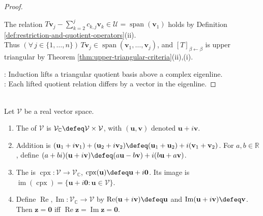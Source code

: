 \begin{theorem}
\begin{proof}
\begin{enumerate}[label=(\roman*)]
The relation $T\mathbf{v}_j-\sum\limits_{k=2}^{j}c_{k,j}\mathbf{v}_k\in\mathcal{U}=\operatorname{span}(\mathbf{v}_1)$ holds by Definition \ref{def:restriction-and-quotient-operators}(ii).\\
Thus $(\forall\,j\in\{1,\ldots,n\})\,T\mathbf{v}_j\in\operatorname{span}(\mathbf{v}_1,\ldots,\mathbf{v}_j)$, and $[T]_{\beta\leftarrow\beta}$ is upper triangular by Theorem \ref{thm:upper-triangular-criteria}(ii),(i).
\end{enumerate}
: Induction lifts a triangular quotient basis above a complex eigenline.\\
: Each lifted quotient relation differs by a vector in the eigenline.
\end{proof}
\end{theorem}

\begin{definition} \label{def:complexification-real-vector-space} \\
Let $\mathcal{V}$ be a real vector space.
\begin{enumerate}[label=(\roman*)]
\setlength{\itemsep}{0pt}
\item The  of $\mathcal{V}$ is $\mathcal{V}_{\mathbb{C}}\defeq\mathcal{V}\times\mathcal{V}$, with $(\mathbf{u},\mathbf{v})$ denoted $\mathbf{u}+i\mathbf{v}$.
\item Addition is $(\mathbf{u}_1+i\mathbf{v}_1)+(\mathbf{u}_2+i\mathbf{v}_2)\defeq(\mathbf{u}_1+\mathbf{u}_2)+i(\mathbf{v}_1+\mathbf{v}_2)$. For $a,b\in\mathbb{R}$, define $(a+bi)(\mathbf{u}+i\mathbf{v})\defeq(a\mathbf{u}-b\mathbf{v})+i(b\mathbf{u}+a\mathbf{v})$.
\item The  is $\operatorname{cpx}:\mathcal{V}\to\mathcal{V}_{\mathbb{C}}$, $\operatorname{cpx}(\mathbf{u})\defeq\mathbf{u}+i\mathbf{0}$. Its image is $\operatorname{im}(\operatorname{cpx})=\{\mathbf{u}+i\mathbf{0}:\mathbf{u}\in\mathcal{V}\}$.
\item Define $\operatorname{Re},\operatorname{Im}:\mathcal{V}_{\mathbb{C}}\to\mathcal{V}$ by $\operatorname{Re}(\mathbf{u}+i\mathbf{v})\defeq\mathbf{u}$ and $\operatorname{Im}(\mathbf{u}+i\mathbf{v})\defeq\mathbf{v}$. Then $\mathbf{z}=\mathbf{0}$ iff $\operatorname{Re}\mathbf{z}=\operatorname{Im}\mathbf{z}=\mathbf{0}$.
\end{enumerate}
\end{definition}

